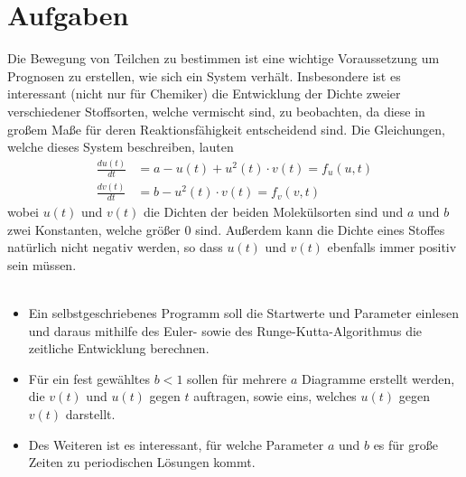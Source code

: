 \documentclass[12pt,a4paper,titlepage,headinclude,bibtotoc]{scrartcl}
\begin{document}
\section{Aufgaben}
Die Bewegung von Teilchen zu bestimmen ist eine wichtige Voraussetzung um Prognosen zu erstellen, wie sich ein System verhält.
Insbesondere ist es interessant (nicht nur für Chemiker) die Entwicklung der Dichte zweier verschiedener Stoffsorten, welche vermischt sind, zu beobachten, da diese in großem Maße für deren Reaktionsfähigkeit entscheidend sind.
Die Gleichungen, welche dieses System beschreiben, lauten
\begin{align}
\frac{du(t)}{dt}&=a-u(t)+u^2(t)\cdot v(t)=f_u(u,t)\\
\frac{dv(t)}{dt}&=b-u^2(t)\cdot v(t)=f_v(v,t)
\end{align}
wobei $u(t)$ und $v(t)$ die Dichten der beiden Molekülsorten sind und $a$ und $b$ zwei Konstanten, welche größer 0 sind. Außerdem kann die Dichte eines Stoffes natürlich nicht negativ werden, so dass $u(t)$ und $v(t)$ ebenfalls immer positiv sein müssen.\\\\
\begin{itemize}
	\item Ein selbstgeschriebenes Programm soll die Startwerte und Parameter einlesen und daraus mithilfe des Euler- sowie des Runge-Kutta-Algorithmus die zeitliche Entwicklung berechnen.
	\item Für ein fest gewähltes $b<1$ sollen für mehrere $a$ Diagramme erstellt werden, die $v(t)$ und $u(t)$ gegen $t$ auftragen, sowie eins, welches $u(t)$ gegen $v(t)$ darstellt.
	\item Des Weiteren ist es interessant, für welche Parameter $a$ und $b$ es für große Zeiten zu periodischen Lösungen kommt.
\end{itemize}
\end{document}
